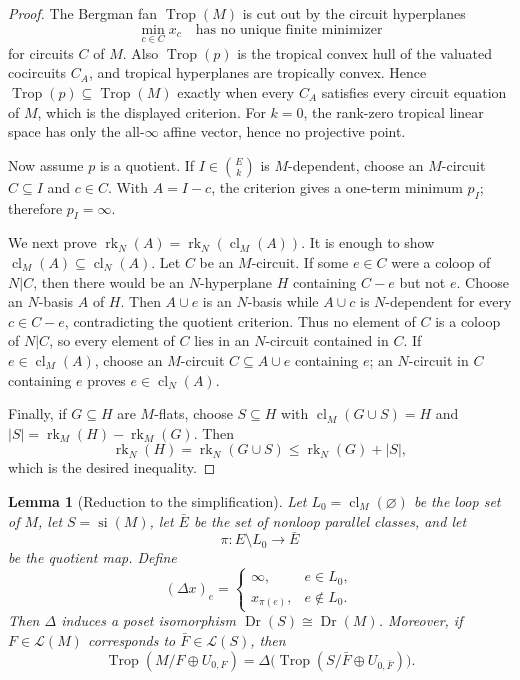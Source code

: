 \documentclass[12pt]{article}
\newtheorem{lemma}[theorem]{Lemma}
\theoremstyle{definition}
\newcommand{\Trop}{\operatorname{Trop}}
\newcommand{\Dr}{\operatorname{Dr}}
\newcommand{\rk}{\operatorname{rk}}
\newcommand{\cl}{\operatorname{cl}}
\newcommand{\cL}{\mathcal L}
\newcommand{\binomE}[1]{\binom{E}{#1}}
\begin{document}
\begin{proof}
The Bergman fan \(\Trop(M)\) is cut out by the circuit hyperplanes
\[
\min_{c\in C}x_c\quad\text{has no unique finite minimizer}
\]
for circuits \(C\) of \(M\).  Also \(\Trop(p)\) is the tropical convex hull of the valuated cocircuits \(C_A\), and tropical hyperplanes are tropically convex.  Hence \(\Trop(p)\subseteq\Trop(M)\) exactly when every \(C_A\) satisfies every circuit equation of \(M\), which is the displayed criterion.  For \(k=0\), the rank-zero tropical linear space has only the all-\(\infty\) affine vector, hence no projective point.

Now assume \(p\) is a quotient.  If \(I\in\binomE{k}\) is \(M\)-dependent, choose an \(M\)-circuit \(C\subseteq I\) and \(c\in C\).  With \(A=I-c\), the criterion gives a one-term minimum \(p_I\); therefore \(p_I=\infty\).

We next prove \(\rk_N(A)=\rk_N(\cl_M(A))\).  It is enough to show \(\cl_M(A)\subseteq\cl_N(A)\). Let \(C\) be an \(M\)-circuit.  If some \(e\in C\) were a coloop of \(N|C\), then there would be an \(N\)-hyperplane \(H\) containing \(C-e\) but not \(e\).  Choose an \(N\)-basis \(A\) of \(H\).  Then \(A\cup e\) is an \(N\)-basis while \(A\cup c\) is \(N\)-dependent for every \(c\in C-e\), contradicting the quotient criterion.  Thus no element of \(C\) is a coloop of \(N|C\), so every element of \(C\) lies in an \(N\)-circuit contained in \(C\).  If \(e\in\cl_M(A)\), choose an \(M\)-circuit \(C\subseteq A\cup e\) containing \(e\); an \(N\)-circuit in \(C\) containing \(e\) proves \(e\in\cl_N(A)\).

Finally, if \(G\subseteq H\) are \(M\)-flats, choose \(S\subseteq H\) with \(\cl_M(G\cup S)=H\) and \(|S|=\rk_M(H)-\rk_M(G)\).  Then
\[
\rk_N(H)=\rk_N(G\cup S)\le \rk_N(G)+|S|,
\]
which is the desired inequality.
\end{proof}

\begin{lemma}[Reduction to the simplification]\label{lem:simplification}
Let \(L_0=\cl_M(\varnothing)\) be the loop set of \(M\), let \(S=\operatorname{si}(M)\), let \(\bar E\) be the set of nonloop parallel classes, and let
\[
\pi:E\setminus L_0\to \bar E
\]
be the quotient map.  Define
\[
(\Delta x)_e=
\begin{cases}
\infty,& e\in L_0,\\
x_{\pi(e)},& e\notin L_0.
\end{cases}
\]
Then \(\Delta\) induces a poset isomorphism \(\Dr(S)\cong \Dr(M)\).  Moreover, if \(F\in\cL(M)\) corresponds to \(\bar F\in\cL(S)\), then
\[
\Trop(M/F\oplus U_{0,F})
=
\Delta\bigl(\Trop(S/\bar F\oplus U_{0,\bar F})\bigr).
\]
\end{lemma}
\end{document}
